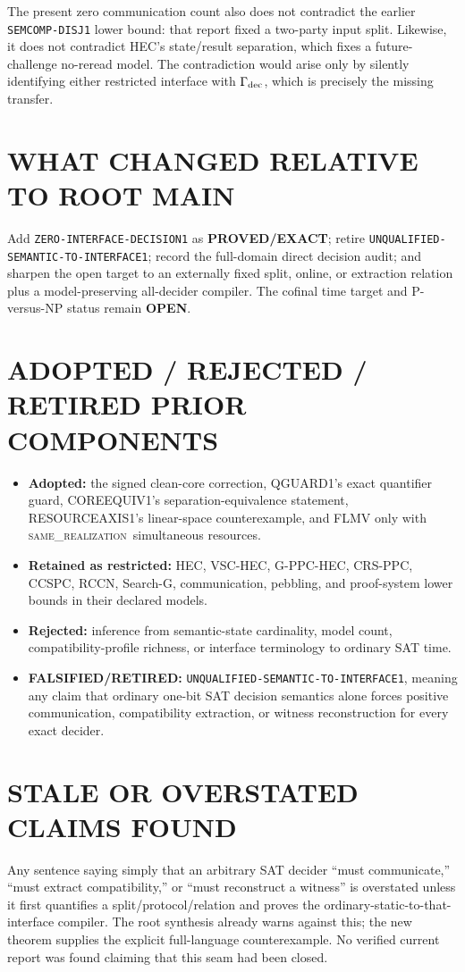 \documentclass[11pt]{article}
\newcommand{\same}{\textsc{same\_realization}}
\begin{document}
The present zero communication count also does not contradict the earlier
\texttt{SEMCOMP-DISJ1} lower bound: that report fixed a two-party input split.
Likewise, it does not contradict HEC's state/result separation, which fixes a
future-challenge no-reread model.  The contradiction would arise only by
silently identifying either restricted interface with
\(\Gamma_{\rm dec}\), which is precisely the missing transfer.

\section{WHAT CHANGED RELATIVE TO ROOT MAIN}
Add \texttt{ZERO-INTERFACE-DECISION1} as \textbf{PROVED/EXACT}; retire
\texttt{UNQUALIFIED-SEMANTIC-TO-INTERFACE1}; record the full-domain direct
decision audit; and sharpen the open target to an externally fixed split,
online, or extraction relation plus a model-preserving all-decider compiler.
The cofinal time target and P-versus-NP status remain \textbf{OPEN}.

\section{ADOPTED / REJECTED / RETIRED PRIOR COMPONENTS}
\begin{itemize}
\item \textbf{Adopted:} the signed clean-core correction, QGUARD1's exact
  quantifier guard, COREEQUIV1's separation-equivalence statement,
  RESOURCEAXIS1's linear-space counterexample, and FLMV only with
  \same\ simultaneous resources.
\item \textbf{Retained as restricted:} HEC, VSC-HEC, G-PPC-HEC, CRS-PPC,
  CCSPC, RCCN, Search-G, communication, pebbling, and proof-system lower
  bounds in their declared models.
\item \textbf{Rejected:} inference from semantic-state cardinality, model
  count, compatibility-profile richness, or interface terminology to ordinary
  SAT time.
\item \textbf{FALSIFIED/RETIRED:}
  \texttt{UNQUALIFIED-SEMANTIC-TO-INTERFACE1}, meaning any claim that ordinary
  one-bit SAT decision semantics alone forces positive communication,
  compatibility extraction, or witness reconstruction for every exact
  decider.
\end{itemize}

\section{STALE OR OVERSTATED CLAIMS FOUND}
Any sentence saying simply that an arbitrary SAT decider ``must communicate,''
``must extract compatibility,'' or ``must reconstruct a witness'' is
overstated unless it first quantifies a split/protocol/relation and proves the
ordinary-static-to-that-interface compiler.  The root synthesis already warns
against this; the new theorem supplies the explicit full-language
counterexample.  No verified current report was found claiming that this seam
had been closed.
\end{document}
